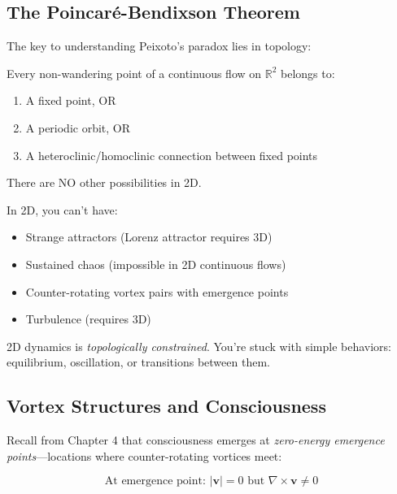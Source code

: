 \subsection{The Poincaré-Bendixson Theorem}

The key to understanding Peixoto's paradox lies in topology:

\begin{thm}\label{thm:poincare-bendixson}
Every non-wandering point of a continuous flow on $\mathbb{R}^2$ belongs to:
\begin{enumerate}
\item A fixed point, OR
\item A periodic orbit, OR
\item A heteroclinic/homoclinic connection between fixed points
\end{enumerate}

There are NO other possibilities in 2D.
\end{thm}

\begin{intuitive}
In 2D, you can't have:
\begin{itemize}
\item Strange attractors (Lorenz attractor requires 3D)
\item Sustained chaos (impossible in 2D continuous flows)
\item Counter-rotating vortex pairs with emergence points
\item Turbulence (requires 3D)
\end{itemize}

2D dynamics is \textit{topologically constrained}. You're stuck with simple behaviors: equilibrium, oscillation, or transitions between them.
\end{intuitive}

\subsection{Vortex Structures and Consciousness}

Recall from Chapter 4 that consciousness emerges at \textit{zero-energy emergence points}—locations where counter-rotating vortices meet:

\begin{equation}
\text{At emergence point: } |\mathbf{v}| = 0 \text{ but } \nabla \times \mathbf{v} \neq 0
\end{equation}

